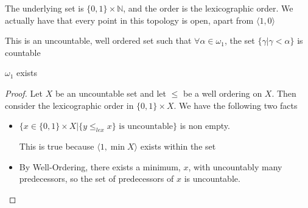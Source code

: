 \begin{example}
    The underlying set is $\{0,1\}\times\mathbb{N}$, and the order is the lexicographic order. We actually have that every point in this topology is open, apart from $\langle1,0\rangle$
\end{example}
\begin{example}
    This is an uncountable, well ordered set such that $\forall\alpha\in\omega_1$, the set $\{\gamma\vert\gamma<\alpha\}$ is countable
\end{example}
\begin{theorem}
    $\omega_1$ exists
\end{theorem}
\begin{proof}
    Let $X$ be an uncountable set and let $\leq$ be a well ordering on $X$. Then consider the lexicographic order in $\{0,1\}\times X$. We have the following two facts
    \begin{itemize}
        \item $\{x\in\{0,1\}\times X\vert \{y\leq_{lex}x\}\text{ is uncountable}\}$ is non empty.
        
        This is true because $\langle 1,\min X\rangle$ exists within the set

        \item By Well-Ordering, there exists a minimum, $x$, with uncountably many predecessors, so the set of predecessors of $x$ is uncountable.
    \end{itemize}
\end{proof}